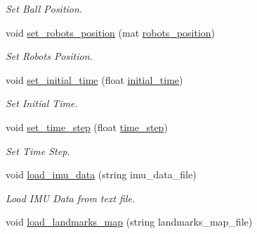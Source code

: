 \begin{DoxyCompactItemize}
\begin{DoxyCompactList}\small\item\em Set Ball Position. \end{DoxyCompactList}\item 
\mbox{\label{class_robot_navigation_add5c64467da4ca8774dd867247ee7733}} 
void \hyperlink{class_robot_navigation_add5c64467da4ca8774dd867247ee7733}{set\+\_\+robots\+\_\+position} (mat \hyperlink{class_robot_navigation_a75aaeeea363d928d6dc8c6de90824d3f}{robots\+\_\+position})
\begin{DoxyCompactList}\small\item\em Set Robots Position. \end{DoxyCompactList}\item 
\mbox{\label{class_robot_navigation_ad4127e6135f10fefffd0524e5cf224e3}} 
void \hyperlink{class_robot_navigation_ad4127e6135f10fefffd0524e5cf224e3}{set\+\_\+initial\+\_\+time} (float \hyperlink{class_robot_navigation_a0aefa2162f9e8911625c977b134cd333}{initial\+\_\+time})
\begin{DoxyCompactList}\small\item\em Set Initial Time. \end{DoxyCompactList}\item 
\mbox{\label{class_robot_navigation_a5f47abc9fd8fe81c2d4df33cd732a84a}} 
void \hyperlink{class_robot_navigation_a5f47abc9fd8fe81c2d4df33cd732a84a}{set\+\_\+time\+\_\+step} (float \hyperlink{class_robot_navigation_a1f1de08123eaff99571bb21fa411d4dd}{time\+\_\+step})
\begin{DoxyCompactList}\small\item\em Set Time Step. \end{DoxyCompactList}\item 
\mbox{\label{class_robot_navigation_af1ec4d21b09907e7c849ab603a173484}} 
void \hyperlink{class_robot_navigation_af1ec4d21b09907e7c849ab603a173484}{load\+\_\+imu\+\_\+data} (string imu\+\_\+data\+\_\+file)
\begin{DoxyCompactList}\small\item\em Load I\+MU Data from text file. \end{DoxyCompactList}\item 
void \hyperlink{class_robot_navigation_af936fdf445213270848a4fc881d1cdb7}{load\+\_\+landmarks\+\_\+map} (string landmarks\+\_\+map\+\_\+file)

\end{DoxyCompactItemize}
